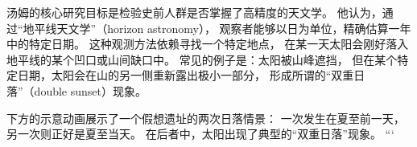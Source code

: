 \bigskip
汤姆的核心研究目标是检验史前人群是否掌握了高精度的天文学。  
他认为，通过“地平线天文学”（horizon astronomy），  
观察者能够以日为单位，精确估算一年中的特定日期。  
这种观测方法依赖寻找一个特定地点，  
在某一天太阳会刚好落入地平线的某个凹口或山间缺口中。  
常见的例子是：太阳被山峰遮挡，  
但在某个特定日期，太阳会在山的另一侧重新露出极小一部分，  
形成所谓的“双重日落”（double sunset）现象。  

\bigskip
下方的示意动画展示了一个假想遗址的两次日落情景：  
一次发生在夏至前一天，另一次则正好是夏至当天。  
在后者中，太阳出现了典型的“双重日落”现象。
```

